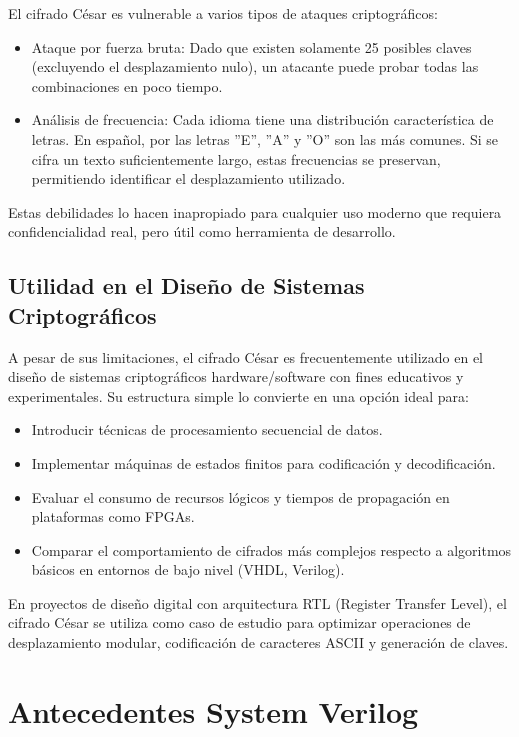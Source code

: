 El cifrado César es vulnerable a varios tipos de ataques criptográficos:

\begin{itemize}
\item Ataque por fuerza bruta: Dado que existen solamente 25 posibles claves (excluyendo el desplazamiento nulo), un atacante puede probar todas las combinaciones en poco tiempo.
\item Análisis de frecuencia: Cada idioma tiene una distribución característica de letras. En español, por   las letras ''E'', ''A'' y ''O'' son las más comunes. Si se cifra un texto suficientemente largo, estas frecuencias se preservan, permitiendo identificar el desplazamiento utilizado.
\end{itemize}

Estas debilidades lo hacen inapropiado para cualquier uso moderno que requiera confidencialidad real, pero útil como herramienta de desarrollo.

\section{Utilidad en el Diseño de Sistemas Criptográficos}
A pesar de sus limitaciones, el cifrado César es frecuentemente utilizado en el diseño de sistemas criptográficos hardware/software con fines educativos y experimentales. Su estructura simple lo convierte en una opción ideal para:

\begin{itemize}
\item Introducir técnicas de procesamiento secuencial de datos.
\item Implementar máquinas de estados finitos para codificación y decodificación.
\item Evaluar el consumo de recursos lógicos y tiempos de propagación en plataformas como FPGAs.
\item Comparar el comportamiento de cifrados más complejos respecto a algoritmos básicos en entornos de bajo nivel (VHDL, Verilog).
\end{itemize}

En proyectos de diseño digital con arquitectura RTL (Register Transfer Level), el cifrado César se utiliza como caso de estudio para optimizar operaciones de desplazamiento modular, codificación de caracteres ASCII y generación de claves.



\chapter{Antecedentes System Verilog}


